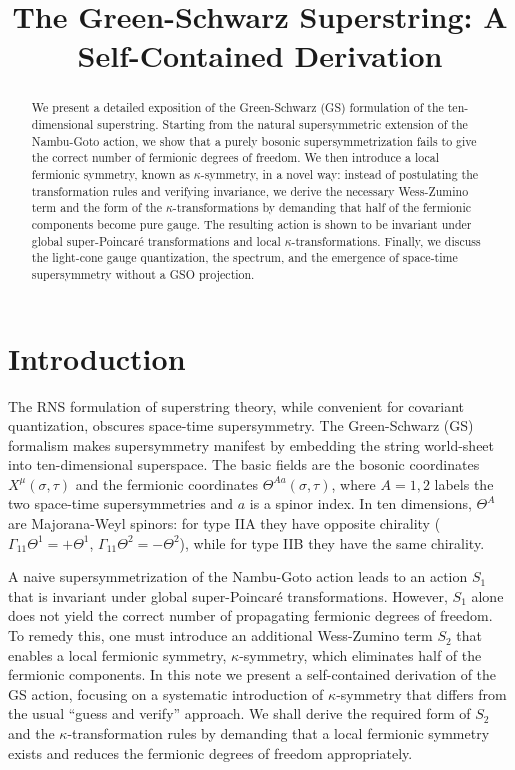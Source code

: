 \documentclass[12pt]{article}
\title{The Green-Schwarz Superstring: A Self-Contained Derivation}
\author{}
\date{}
\begin{document}
\maketitle

\begin{abstract}
We present a detailed exposition of the Green-Schwarz (GS) formulation of the ten-dimensional superstring. Starting from the natural supersymmetric extension of the Nambu-Goto action, we show that a purely bosonic supersymmetrization fails to give the correct number of fermionic degrees of freedom. We then introduce a local fermionic symmetry, known as $\kappa$-symmetry, in a novel way: instead of postulating the transformation rules and verifying invariance, we derive the necessary Wess-Zumino term and the form of the $\kappa$-transformations by demanding that half of the fermionic components become pure gauge. The resulting action is shown to be invariant under global super-Poincar\'e transformations and local $\kappa$-transformations. Finally, we discuss the light-cone gauge quantization, the spectrum, and the emergence of space-time supersymmetry without a GSO projection.
\end{abstract}

\section{Introduction}

The RNS formulation of superstring theory, while convenient for covariant quantization, obscures space-time supersymmetry. The Green-Schwarz (GS) formalism makes supersymmetry manifest by embedding the string world-sheet into ten-dimensional superspace. The basic fields are the bosonic coordinates $X^\mu(\sigma,\tau)$ and the fermionic coordinates $\Theta^{Aa}(\sigma,\tau)$, where $A=1,2$ labels the two space-time supersymmetries and $a$ is a spinor index. In ten dimensions, $\Theta^A$ are Majorana-Weyl spinors: for type IIA they have opposite chirality ($\Gamma_{11}\Theta^1 = +\Theta^1$, $\Gamma_{11}\Theta^2 = -\Theta^2$), while for type IIB they have the same chirality.

A naive supersymmetrization of the Nambu-Goto action leads to an action $S_1$ that is invariant under global super-Poincar\'e transformations. However, $S_1$ alone does not yield the correct number of propagating fermionic degrees of freedom. To remedy this, one must introduce an additional Wess-Zumino term $S_2$ that enables a local fermionic symmetry, $\kappa$-symmetry, which eliminates half of the fermionic components. In this note we present a self-contained derivation of the GS action, focusing on a systematic introduction of $\kappa$-symmetry that differs from the usual ``guess and verify'' approach. We shall derive the required form of $S_2$ and the $\kappa$-transformation rules by demanding that a local fermionic symmetry exists and reduces the fermionic degrees of freedom appropriately.
\end{document}
